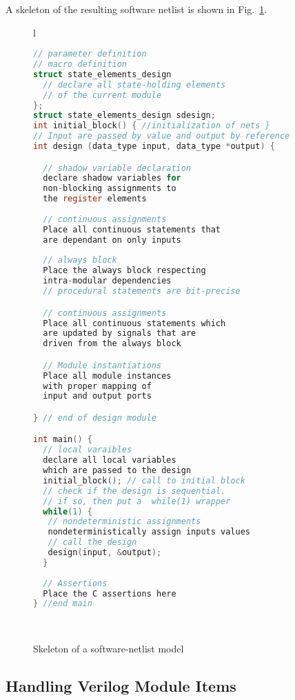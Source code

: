 A skeleton of the resulting software netlist is shown in Fig.~\ref{figure:structure}. 

%
\begin{figure}[t]
\captionsetup{justification=justified}
\scriptsize
\begin{tabular}{l}
\begin{lstlisting}[mathescape=true,language=C]
// parameter definition
// macro definition
struct state_elements_design
  // declare all state-holding elements
  // of the current module 
};
struct state_elements_design sdesign;
int initial_block() { //initialization of nets }
// Input are passed by value and output by reference
int design (data_type input, data_type *output) {

  // shadow variable declaration
  declare shadow variables for 
  non-blocking assignments to 
  the register elements  
  
  // continuous assignments
  Place all continuous statements that
  are dependant on only inputs
 
  // always block 
  Place the always block respecting
  intra-modular dependencies
  // procedural statements are bit-precise

  // continuous assignments
  Place all continuous statements which 
  are updated by signals that are 
  driven from the always block

  // Module instantiations 
  Place all module instances 
  with proper mapping of 
  input and output ports

} // end of design module

int main() {
  // local varaibles 
  declare all local variables 
  which are passed to the design 
  initial_block(); // call to initial block
  // check if the design is sequential.
  // if so, then put a  while(1) wrapper
  while(1) {
   // nondeterministic assignments
   nondeterministically assign inputs values  
   // call the design
   design(input, &output);
  }
 
  // Assertions 
  Place the C assertions here 
} //end main 
\end{lstlisting}
\\
\end{tabular}
\caption{Skeleton of a software-netlist model}
\label{figure:structure}
\end{figure}

\subsection{Handling Verilog Module Items}

